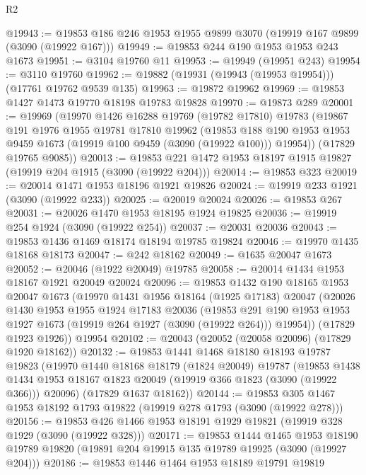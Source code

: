 \begin{lexlean}{R2}
\begin{coremodule}
@19943 := @19853 @186 @246 @1953 @1955 @9899 @3070 (@19919 @167 @9899 (@3090 (@19922 @167)))
@19949 := @19853 @244 @190 @1953 @1953 @243 @1673
@19951 := @3104 @19760 @11
@19953 := @19949 (@19951 @243)
@19954 := @3110 @19760
@19962 := @19882 (@19931 (@19943 (@19953 @19954))) (@17761 @19762 @9539 @135)
@19963 := @19872 @19962
@19969 := @19853 @1427 @1473 @19770 @18198 @19783 @19828
@19970 := @19873 @289
@20001 := @19969
    (@19970
      @1426
      @16288
      @19769
      (@19782 @17810)
      @19783
      (@19867
        @191
        @1976
        @1955
        @19781
        @17810
        @19962
        (@19853 @188 @190 @1953 @1953 @9459 @1673 (@19919 @100 @9459 (@3090 (@19922 @100))) @19954))
      (@17829 @19765 @9085))
@20013 := @19853 @221 @1472 @1953 @18197 @1915 @19827 (@19919 @204 @1915 (@3090 (@19922 @204)))
@20014 := @19853 @323
@20019 := @20014 @1471 @1953 @18196 @1921 @19826
@20024 := @19919 @233 @1921 (@3090 (@19922 @233))
@20025 := @20019 @20024
@20026 := @19853 @267
@20031 := @20026 @1470 @1953 @18195 @1924 @19825
@20036 := @19919 @254 @1924 (@3090 (@19922 @254))
@20037 := @20031 @20036
@20043 := @19853 @1436 @1469 @18174 @18194 @19785 @19824
@20046 := @19970 @1435 @18168 @18173
@20047 := @242 @18162
@20049 := @1635 @20047 @1673
@20052 := @20046 (@1922 @20049) @19785
@20058 := @20014 @1434 @1953 @18167 @1921 @20049 @20024
@20096 := @19853
    @1432
    @190
    @18165
    @1953
    @20047
    @1673
    (@19970
      @1431
      @1956
      @18164
      (@1925 @17183)
      @20047
      (@20026
        @1430
        @1953
        @1955
        @1924
        @17183
        @20036
        (@19853 @291 @190 @1953 @1953 @1927 @1673 (@19919 @264 @1927 (@3090 (@19922 @264))) @19954))
      (@17829 @1923 @1926))
    @19954
@20102 := @20043 (@20052 (@20058 @20096) (@17829 @1920 @18162))
@20132 := @19853
    @1441
    @1468
    @18180
    @18193
    @19787
    @19823
    (@19970
      @1440
      @18168
      @18179
      (@1824 @20049)
      @19787
      (@19853
        @1438
        @1434
        @1953
        @18167
        @1823
        @20049
        (@19919 @366 @1823 (@3090 (@19922 @366)))
        @20096)
      (@17829 @1637 @18162))
@20144 := @19853 @305 @1467 @1953 @18192 @1793 @19822 (@19919 @278 @1793 (@3090 (@19922 @278)))
@20156 := @19853 @426 @1466 @1953 @18191 @1929 @19821 (@19919 @328 @1929 (@3090 (@19922 @328)))
@20171 := @19853
    @1444
    @1465
    @1953
    @18190
    @19789
    @19820
    (@19891 @204 @19915 @135 @19789 @19925 (@3090 (@19927 @204)))
@20186 := @19853
    @1446
    @1464
    @1953
    @18189
    @19791
    @19819

\end{coremodule}
\end{lexlean}
